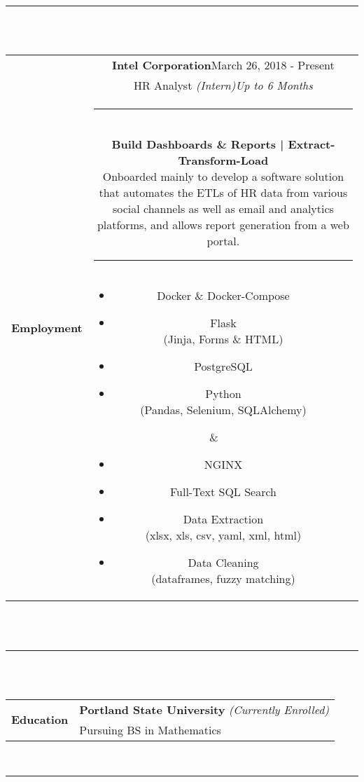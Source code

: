 \documentclass[12pt]{article}
\begin{document}
\\\\\rule{5.5in}{1pt}\\\\
\normalsize
\begin{tabular}{r|c|c}
    \multirow{5}{*}{\textbf{Employment}}
    &\multicolumn{2}{|c}{
        \textbf{Intel Corporation}\hspace{3cm}\footnotesize March 26, 2018 - Present}\\
    &\multicolumn{2}{|c}{
        \footnotesize HR Analyst \footnotesize\textit{(Intern)}\hspace{4.5cm}\footnotesize\textit{Up to 6 Months}\small}\\
    &\multicolumn{2}{|c}{\rule{4.2in}{.6pt} }\\
    &\multicolumn{2}{|c}{\parbox{11cm}{\footnotesize\hspace{0.4cm}
        \textbf{Build Dashboards \& Reports | Extract-Transform-Load}\\
    Onboarded mainly to develop a software solution that automates the ETLs
    of HR data from various social channels as well as email and analytics
    platforms, and allows report generation from a web portal.\\\hspace*{0.5em}\rule[0.5em]{4.2in}{0.1pt}
    }}\\

    & \parbox{2.1in}{\footnotesize %
        \begin{itemize}[noitemsep, topsep=0em] \footnotesize
        \item Docker \& Docker-Compose
        \item Flask\\
            \tiny(Jinja, Forms \& HTML)\footnotesize
        \item PostgreSQL
        \item Python\\
            \tiny(Pandas, Selenium, SQLAlchemy)\footnotesize
        \end{itemize}
	}
    & \parbox{2.1in}{\footnotesize %
        \begin{itemize}[noitemsep, topsep=0em] \footnotesize
        \item NGINX
        \item Full-Text SQL Search
        \item Data Extraction\\
            \tiny(xlsx, xls, csv, yaml, xml, html)\\\footnotesize
        \item Data Cleaning\\
            \tiny(dataframes, fuzzy matching)
        \end{itemize}
    }
    
\end{tabular} \normalsize
\\\\\rule{5.5in}{1pt}\\\\
\begin{tabular}{r|l}
\multirow{2}{*}{\textbf{Education}} & \textbf{Portland State University} \footnotesize\textit{(Currently Enrolled)}\\
& \footnotesize Pursuing BS in Mathematics\\
\end{tabular}
\\\rule[-1.05em]{5.5in}{1pt}
\end{document}
